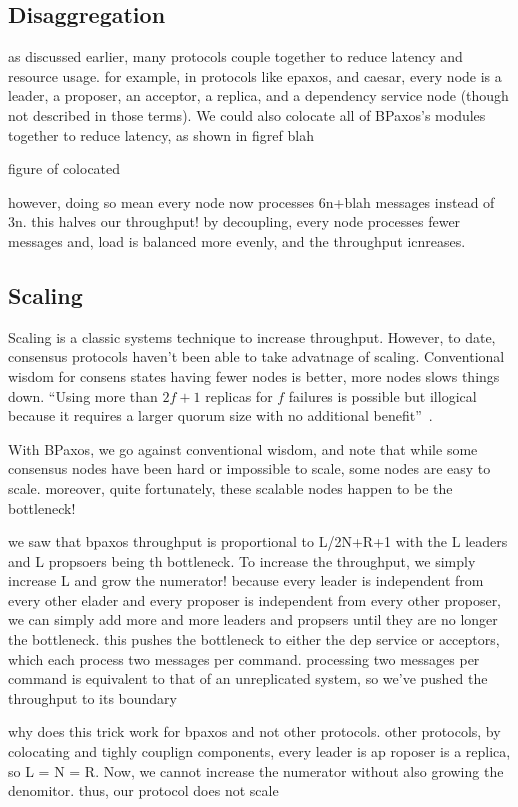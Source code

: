 \subsection{Disaggregation}
as discussed earlier, many protocols couple together to reduce latency and resource usage. for example, in protocols like epaxos, and caesar, every node is a leader, a proposer, an acceptor, a replica, and a dependency service node (though not described in those terms). We could also colocate all of BPaxos's modules together to reduce latency, as shown in figref blah

figure of colocated

however, doing so mean every node now processes 6n+blah messages instead of 3n. this halves our throughput! by decoupling, every node processes fewer messages and, load is balanced more evenly, and the throughput icnreases.

\subsection{Scaling}
Scaling is a classic systems technique to increase
throughput. However, to date, consensus protocols haven't been able to take
advatnage of scaling. Conventional wisdom for consens states having fewer nodes
is better, more nodes slows things down. ``Using more than $2f+1$ replicas for
$f$ failures is possible but illogical because it requires a larger quorum size
with no additional benefit''~\cite{zhang2018building}.

With BPaxos, we go against conventional wisdom, and note that while some consensus nodes have been hard or impossible to scale, some nodes are easy to scale. moreover, quite fortunately, these scalable nodes happen to be the bottleneck!

we saw that bpaxos throughput is proportional to L/2N+R+1 with the L leaders and L propsoers being th bottleneck. To increase the throughput, we simply increase L and grow the numerator! because every leader is independent from every other elader and every proposer is independent from every other proposer, we can simply add more and more leaders and propsers until they are no longer the bottleneck. this pushes the bottleneck to either the dep service or acceptors, which each process two messages per command. processing two messages per command is equivalent to that of an unreplicated system, so we've pushed the throughput to its boundary

why does this trick work for bpaxos and not other protocols. other protocols, by colocating and tighly couplign components, every leader is ap roposer is a replica, so L = N = R. Now, we cannot increase the numerator without also growing the denomitor. thus, our protocol does not scale
